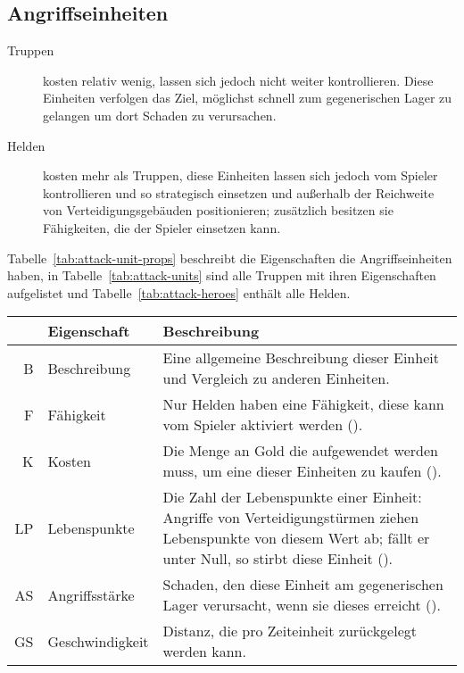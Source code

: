 \subsection{Angriffseinheiten}

\begin{description}
  \item[Truppen]
    kosten relativ wenig, lassen sich jedoch nicht weiter kontrollieren. Diese
    Einheiten verfolgen das Ziel, möglichst schnell zum gegenerischen Lager zu
    gelangen um dort Schaden zu verursachen.

  \item[Helden] kosten mehr als Truppen, diese Einheiten lassen sich jedoch vom
    Spieler kontrollieren und so strategisch einsetzen und außerhalb der
    Reichweite von Verteidigungsgebäuden positionieren; zusätzlich besitzen sie
    Fähigkeiten, die der Spieler einsetzen kann.

\end{description}

Tabelle~\ref{tab:attack-unit-props} beschreibt die Eigenschaften die
Angriffseinheiten haben, in Tabelle~\ref{tab:attack-units} sind alle Truppen
mit ihren Eigenschaften aufgelistet und Tabelle~\ref{tab:attack-heroes} enthält
alle Helden.

\begin{table}[htbp]
  \caption{Eigenschaften von Angriffseinheiten}
  \label{tab:attack-unit-props}
  \small
  \begin{longtabu}{rlX}
    \toprule\rowfont{\itshape}
    & Eigenschaft & Beschreibung \\
    \midrule

    B  & Beschreibung
       & Eine allgemeine Beschreibung dieser Einheit und Vergleich zu anderen
         Einheiten. \\
    F  & Fähigkeit
       & Nur Helden haben eine Fähigkeit, diese kann vom Spieler aktiviert
         werden (). \\
    K  & Kosten
       & Die Menge an Gold die aufgewendet werden muss, um eine dieser
         Einheiten zu kaufen (). \\
    LP & Lebenspunkte
       & Die Zahl der Lebenspunkte einer Einheit: Angriffe von
         Verteidigungstürmen ziehen Lebenspunkte von diesem Wert ab; fällt er
         unter Null, so stirbt diese Einheit (). \\
    AS & Angriffsstärke
       & Schaden, den diese Einheit am gegenerischen Lager verursacht, wenn sie
         dieses erreicht (). \\
    GS & Geschwindigkeit & Distanz, die pro Zeiteinheit zurückgelegt werden
         kann. \\

    \bottomrule
  \end{longtabu}
\end{table}

